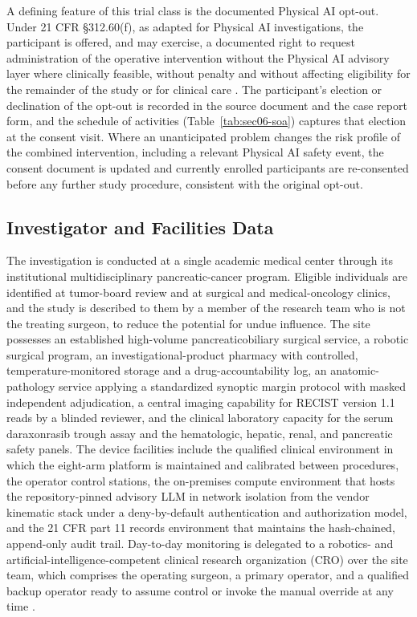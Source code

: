 A defining feature of this trial class is the documented Physical AI opt-out. Under
21 CFR \S 312.60(f), as adapted for Physical AI investigations, the participant is
offered, and may exercise, a documented right to request administration of the
operative intervention without the Physical AI advisory layer where clinically
feasible, without penalty and without affecting eligibility for the remainder of the
study or for clinical care \cite{cfr312paiuni}. The participant's election or
declination of the opt-out is recorded in the source document and the case report
form, and the schedule of activities (Table~\ref{tab:sec06-soa}) captures that
election at the consent visit. Where an unanticipated problem changes the risk
profile of the combined intervention, including a relevant Physical AI safety event,
the consent document is updated and currently enrolled participants are re-consented
before any further study procedure, consistent with the original opt-out.

\subsection{Investigator and Facilities Data}

The investigation is conducted at a single academic medical center through its
institutional multidisciplinary pancreatic-cancer program. Eligible individuals are
identified at tumor-board review and at surgical and medical-oncology clinics, and
the study is described to them by a member of the research team who is not the
treating surgeon, to reduce the potential for undue influence. The site possesses an
established high-volume pancreaticobiliary surgical service, a robotic surgical
program, an investigational-product pharmacy with controlled, temperature-monitored
storage and a drug-accountability log, an anatomic-pathology service applying a
standardized synoptic margin protocol with masked independent adjudication, a central
imaging capability for RECIST version 1.1 reads by a blinded reviewer, and the
clinical laboratory capacity for the serum daraxonrasib trough assay and the
hematologic, hepatic, renal, and pancreatic safety panels. The device facilities
include the qualified clinical environment in which the eight-arm platform is
maintained and calibrated between procedures, the operator control stations, the
on-premises compute environment that hosts the repository-pinned advisory LLM in
network isolation from the vendor kinematic stack under a deny-by-default
authentication and authorization model, and the 21 CFR part 11 records environment
that maintains the hash-chained, append-only audit trail. Day-to-day monitoring is
delegated to a robotics- and artificial-intelligence-competent clinical research
organization (CRO) over the site team, which comprises the operating surgeon, a
primary operator, and a qualified backup operator ready to assume control or invoke
the manual override at any time \cite{onpremwhippl,paisitedocpk}.

